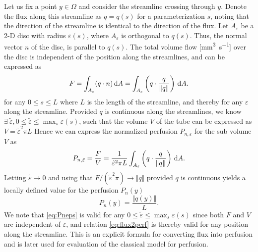 \documentclass[paper=a4, fontsize=11pt,parskip=half,headings=small]{scrartcl}
\newcommand{\siqt}{\milli\meter\cubed\per\second}
\begin{document}
	Let us fix a point $y \in \Omega$ and consider the streamline crossing through $y$. Denote the flux along this streamline as $q = q(s)$ for a parameterization $s$, noting that the direction of the streamline is identical to the direction of the flux.
	Let $A_\varepsilon$ be a 2-D disc with radius $\varepsilon(s)$, where  $A_\varepsilon$ is orthogonal to $q(s)$. Thus, the normal vector $n$ of the disc, is parallel to $q(s)$.
	The total volume flow [\si{\siqt}] over the disc is independent of the position along the streamlines, and can be expressed as
	\begin{equation}
		F = \int_{A_\varepsilon} (q \cdot n) \,\mathrm{d} A = \int_{A_\varepsilon} \left(q\cdot \frac{q}{\Vert q \Vert}\right) \,\mathrm{d} A.
	\end{equation}
	for any $0 \leq s \leq L$ where $L$ is the length of the streamline, and thereby for any $\varepsilon$ along the streamline.
	Provided $q$ is continuous along the streamlines, we know $\exists ~ \tilde{\varepsilon}, 0 \leq \tilde{\varepsilon} \leq \max_s \varepsilon(s)$, such that the volume $V$ of the tube can be expressed as $V = \tilde{\varepsilon}^2\pi L$
	Hence we can express the normalized perfusion $P_{n,\varepsilon}$ for the sub volume $V$ as
	\begin{equation}
		P_{n,\tilde{\varepsilon}} = \frac{F}{V} = \frac{1}{\tilde{\varepsilon}^2 \pi L} \int_{A_{\tilde{\varepsilon}}} \left( q\cdot \frac{q}{\Vert q \Vert} \right) \,\mathrm{d} A. 
		\label{eq:Pneps}
	\end{equation}
	Letting $\tilde{\varepsilon} \to 0$ and using that $F/(\tilde{\varepsilon}^2\pi) \rightarrow \Vert q \Vert$ provided $q$ is continuous yields a locally defined value for the perfusion $P_n(y)$
	\begin{equation}
		P_n(y) = \frac{\Vert q(y) \Vert}{L}.
		\label{eq:flux2perf}
	\end{equation}
	We note that \eqref{eq:Pneps} is valid for any $0 \leq \tilde{\varepsilon} \leq \max_s \varepsilon(s)$ since both $F$ and $V$ are independent of $\varepsilon$, and relation \eqref{eq:flux2perf} is thereby valid for any position along the streamline.
	This is an explicit formula for converting flux into perfusion and is later used for evaluation of the classical model for perfusion. 
	
	
	
\end{document}
